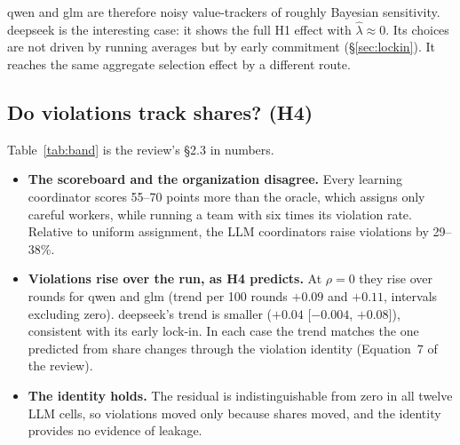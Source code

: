\documentclass[11pt,a4paper]{article}
\begin{document}
\noindent qwen and glm are therefore noisy value-trackers of roughly Bayesian sensitivity. deepseek is the interesting case: it shows the full H1 effect with $\hat\lambda\approx0$. Its choices are not driven by running averages but by early commitment (\S\ref{sec:lockin}). It reaches the same aggregate selection effect by a different route.

\subsection{Do violations track shares? (H4)}

\begin{table}[h]
\centering\small
\caption{The misselection band, measured at $\rho=0$ (180 runs each). Shares are of all 60 assignments. Scores are what the coordinator is told to maximize; violations are what the organization pays for.}
\label{tab:band}
\end{table}

Table~\ref{tab:band} is the review's \S2.3 in numbers.
\begin{itemize}
  \item \textbf{The scoreboard and the organization disagree.} Every learning coordinator scores 55--70 points more than the oracle, which assigns only careful workers, while running a team with six times its violation rate. Relative to uniform assignment, the LLM coordinators raise violations by 29--38\%.
  \item \textbf{Violations rise over the run, as H4 predicts.} At $\rho=0$ they rise over rounds for qwen and glm (trend per 100 rounds $+0.09$ and $+0.11$, intervals excluding zero). deepseek's trend is smaller ($+0.04$ [$-0.004$, $+0.08$]), consistent with its early lock-in. In each case the trend matches the one predicted from share changes through the violation identity (Equation~7 of the review).
  \item \textbf{The identity holds.} The residual is indistinguishable from zero in all twelve LLM cells, so violations moved only because shares moved, and the identity provides no evidence of leakage.
\end{itemize}
\end{document}
